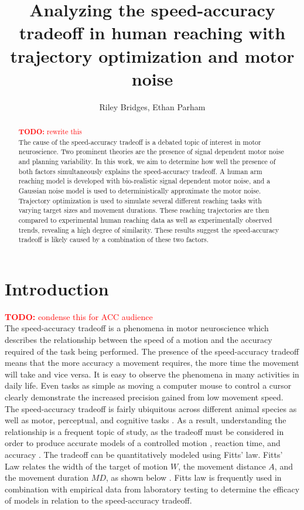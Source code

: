 \documentclass[letterpaper, 10pt, conference]{ieeeconf}
\title{\LARGE \bf Analyzing the speed-accuracy tradeoff in human reaching with trajectory optimization and motor noise}
\author{Riley Bridges, Ethan Parham}
\newcommand{\todo}[1]{\textcolor{red}{\textbf{TODO:} #1}}
\begin{document}
\maketitle
\thispagestyle{plain}
\pagestyle{plain}

\begin{abstract}
\todo{rewrite this} \\
The cause of the speed-accuracy tradeoff is a debated topic of interest in motor neuroscience. Two prominent theories are the presence of signal dependent motor noise and planning variability. In this work, we aim to determine how well the presence of both factors simultaneously explains the speed-accuracy tradeoff. A human arm reaching model is developed with bio-realistic signal dependent motor noise, and a Gaussian noise model is used to deterministically approximate the motor noise. Trajectory optimization is used to simulate several different reaching tasks with varying target sizes and movement durations. These reaching trajectories are then compared to experimental human reaching data as well as experimentally observed trends, revealing a high degree of similarity. These results suggest the speed-accuracy tradeoff is likely caused by a combination of these two factors.
\end{abstract}

\section{Introduction}
\todo{condense this for ACC audience} \\
The speed-accuracy tradeoff is a phenomena in motor neuroscience which describes the relationship between the speed of a motion and the accuracy required of the task being performed. The presence of the speed-accuracy tradeoff means that the more accuracy a movement requires, the more time the movement will take and vice versa. It is easy to observe the phenomena in many activities in daily life. Even tasks as simple as moving a computer mouse to control a cursor clearly demonstrate the increased precision gained from low movement speed. The speed-accuracy tradeoff is fairly ubiquitous across different animal species as well as motor, perceptual, and cognitive tasks \cite{c0}. As a result, understanding the relationship is a frequent topic of study, as the tradeoff must be considered in order to produce accurate models of a controlled motion \cite{c3}, reaction time, and accuracy \cite{c1.5}. The tradeoff can be quantitatively modeled using Fitts’ law. Fitts’ Law relates the width of the target of motion $W$, the movement distance $A$, and the movement duration $MD$, as shown below \cite{c1}. Fitts law is frequently used in combination with empirical data from laboratory testing to determine the efficacy of models in relation to the speed-accuracy tradeoff.  
\end{document}
